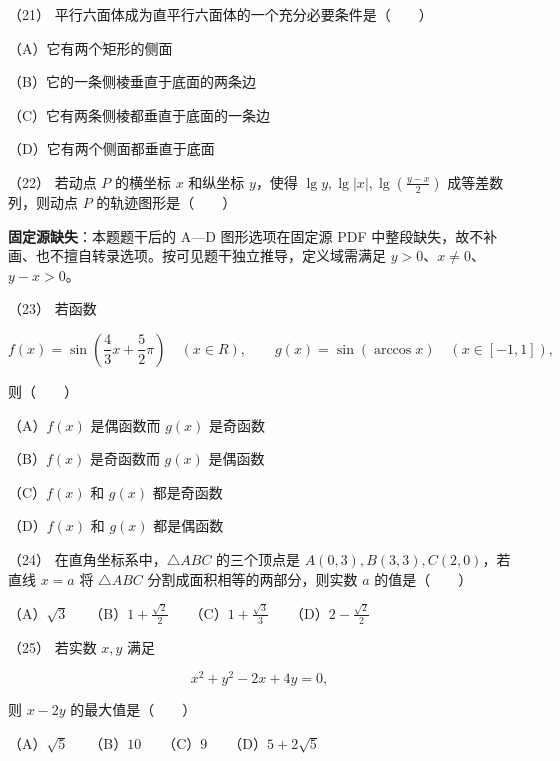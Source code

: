 \begin{question}
（21） 平行六面体成为直平行六面体的一个充分必要条件是\mbox{（　　）}

（A）它有两个矩形的侧面

（B）它的一条侧棱垂直于底面的两条边

（C）它有两条侧棱都垂直于底面的一条边

（D）它有两个侧面都垂直于底面

（22） 若动点 $P$ 的横坐标 $x$ 和纵坐标 $y$，使得 $\lg y,\lg|x|,\lg\left(\frac{y-x}{2}\right)$ 成等差数列，则动点 $P$ 的轨迹图形是\mbox{（　　）}

\begin{gktip}
\textbf{固定源缺失}：本题题干后的 A—D 图形选项在固定源 PDF 中整段缺失，故不补画、也不擅自转录选项。按可见题干独立推导，定义域需满足 $y>0$、$x\ne0$、$y-x>0$。
\end{gktip}

（23） 若函数

\nopagebreak[4]
\[
f(x)=\sin\left(\frac43x+\frac52\pi\right)\quad(x\in R),
\qquad
g(x)=\sin(\arccos x)\quad(x\in[-1,1]),
\]

则\mbox{（　　）}

（A）$f(x)$ 是偶函数而 $g(x)$ 是奇函数

（B）$f(x)$ 是奇函数而 $g(x)$ 是偶函数

（C）$f(x)$ 和 $g(x)$ 都是奇函数

（D）$f(x)$ 和 $g(x)$ 都是偶函数

（24） 在直角坐标系中，$\triangle ABC$ 的三个顶点是 $A(0,3),B(3,3),C(2,0)$，若直线 $x=a$ 将 $\triangle ABC$ 分割成面积相等的两部分，则实数 $a$ 的值是\mbox{（　　）}

（A）$\sqrt3$　　（B）$1+\frac{\sqrt2}{2}$　　（C）$1+\frac{\sqrt3}{3}$　　（D）$2-\frac{\sqrt2}{2}$

（25） 若实数 $x,y$ 满足

\nopagebreak[4]
\[
x^2+y^2-2x+4y=0,
\]

则 $x-2y$ 的最大值是\mbox{（　　）}

（A）$\sqrt5$　　（B）$10$　　（C）$9$　　（D）$5+2\sqrt5$

\end{question}
